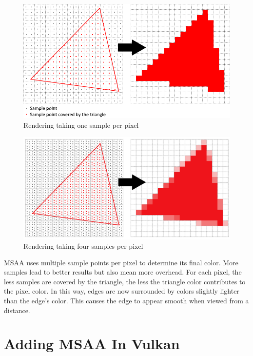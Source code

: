 \begin{figure}[H]
    \centering
    \includegraphics[scale=0.6]{images/ChMSAA/OneSamplePerPixel.png}
    \caption{Rendering taking one sample per pixel}
    \label{fig::OneSamplePerPixel}
\end{figure}

\begin{figure}[H]
    \centering
    \includegraphics[scale=0.62]{images/ChMSAA/FourSamplesPerPixel.png}
    \caption{Rendering taking four samples per pixel}
    \label{fig::FourSamplesPerPixel}
\end{figure}

MSAA uses multiple sample points per pixel to determine its final color.
More samples lead to better results but also mean more overhead.
For each pixel, the less samples are covered by the triangle, the less
the triangle color contributes to the pixel color.
In this way, edges are now surrounded by colors slightly lighter than the
edge's color.
This causes the edge to appear smooth when viewed from a distance.

\section{Adding MSAA In Vulkan}

